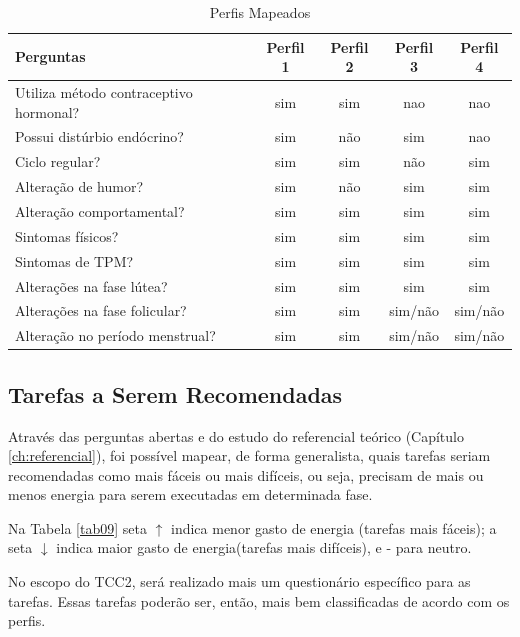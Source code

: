 \begin{table}[]
    \caption{Perfis Mapeados}
    \label{tab08}
    \begin{tabular}{|l|c|c|c|c|}
    \hline
    \rowcolor[HTML]{C0C0C0} 
     Perguntas & Perfil 1 & Perfil 2 & Perfil 3 & Perfil 4 \\ \hline
     Utiliza método contraceptivo hormonal?& sim & sim & nao & nao \\ \hline
    \rowcolor[HTML]{EFEFEF} 
    Possui distúrbio endócrino? & sim & não & sim & nao \\ \hline
    Ciclo regular? & sim & sim & não & sim \\ \hline
    \rowcolor[HTML]{EFEFEF} 
    Alteração de humor? & sim & não & sim & sim \\ \hline
    Alteração comportamental? & sim & sim & sim & sim \\ \hline
    \rowcolor[HTML]{EFEFEF} 
    Sintomas físicos? & sim & sim & sim & sim \\ \hline
    Sintomas de TPM? & sim & sim & sim & sim \\ \hline
    \rowcolor[HTML]{EFEFEF} 
    Alterações na fase lútea? & sim & sim & sim & sim \\ \hline
    Alterações na fase folicular? & sim & sim & sim/não & sim/não \\ \hline
    \rowcolor[HTML]{EFEFEF} 
    Alteração no período menstrual? & sim & sim & sim/não & sim/não \\ \hline
    \end{tabular}
    \end{table}

\subsection{Tarefas a Serem Recomendadas}

Através das perguntas abertas e do estudo do referencial teórico (Capítulo \ref{ch:referencial}), 
foi possível mapear, de forma generalista, quais tarefas seriam 
recomendadas 
como mais fáceis ou mais difíceis, ou seja, precisam de 
mais ou menos energia para serem executadas em determinada fase. 

Na Tabela \ref{tab09} seta $\uparrow$ indica menor gasto de energia
(tarefas mais fáceis); a seta $\downarrow$ indica maior gasto de 
energia(tarefas mais difíceis), e - para neutro.

No escopo do TCC2, será realizado mais um questionário específico para as 
tarefas. Essas tarefas poderão ser, então, mais bem classificadas de acordo 
com os perfis.


